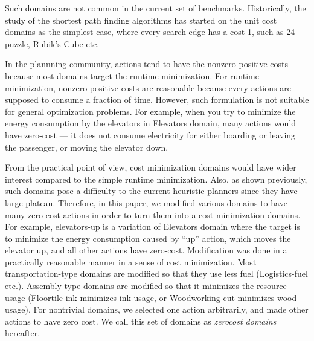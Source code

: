 
Such domains are
not common in the current set of benchmarks.
% 
Historically, the study of the shortest path finding algorithms has
started on the unit cost domains as the simplest case, where every
search edge has a cost 1,
such as 24-puzzle, Rubik's Cube etc.

In the plannning community,
actions tend to have the nonzero positive costs
because most domains target the runtime minimization.
For runtime minimization,
nonzero positive costs are reasonable because
every actions are supposed to consume a fraction of time.
However, such formulation is not suitable for general optimization
problems.  For example, when you try to minimize the energy consumption
by the elevators in Elevators domain, many actions would have zero-cost
--- it does not consume electricity for either boarding or leaving the
passenger, or moving the elevator down.

From the practical point of
view, cost minimization domains would have wider interest compared to
the simple runtime minimization.
Also, as shown previously, such domains pose a
difficulty to the current heuristic planners since they have large plateau.
% 
Therefore, in this paper, we modified various domains to have many
zero-cost actions in order to turn them into a cost minimization domains.
For example, elevators-up is a variation of
Elevators domain where the target is to minimize
the energy consumption caused by ``up'' action, which moves the elevator
up, and all other actions have zero-cost.  Modification was done in a
practically reasonable manner in a sense of cost minimization. Most
transportation-type domains are modified so that they use less
fuel (Logistics-fuel etc.). Assembly-type domains are modified so that it minimizes the
resource usage (Floortile-ink minimizes ink usage, or Woodworking-cut
minimizes wood usage). For nontrivial domains, we selected one action
arbitrarily, and made other actions to have zero cost.
We call this set of domains as \emph{zerocost domains} hereafter.

